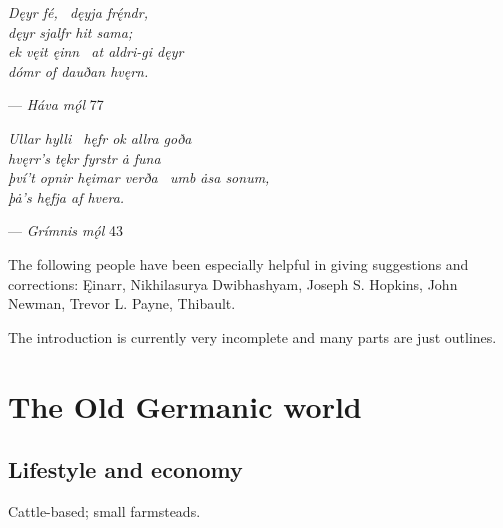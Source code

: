 \vspace{5mm}

\begin{center}{\Large \emph{Dęyr fé, \hld\ dęyja frę́ndr, \\
dęyr sjalfr hit sama; \\
ek vęit ęinn \hld\ at aldri-gi dęyr \\
dómr of dauðan hvęrn.}}\end{center}

\begin{flushright}%
— \emph{Háva mǫ́l} 77%
\end{flushright}

\vspace{5mm}

\begin{center}{\Large \emph{Ullar hylli \hld\ hęfr ok allra goða \\
hvęrr’s tękr fyrstr ȧ funa \\
því’t opnir hęimar verða \hld\ umb ȧsa sonum, \\
þȧ’s hęfja af hvera.}}\end{center}

\begin{flushright}%
— \emph{Grímnis mǫ́l} 43%
\end{flushright}

\vfill

\newpage\thispagestyle{empty}

The following people have been especially helpful in giving suggestions and corrections: Ęinarr, Nikhilasurya Dwibhashyam, Joseph S. Hopkins, John Newman, Trevor L. Payne, Thibault.

\newpage\thispagestyle{empty}

\tableofcontents

\newpage\thispagestyle{empty}

\newpage


\printbibliography%


The introduction is currently very incomplete and many parts are just outlines.

\section{The Old Germanic world}

  \subsection{Lifestyle and economy}
    Cattle-based; small farmsteads.
